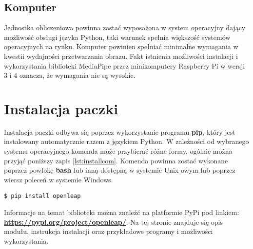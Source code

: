 \subsection{Komputer}
\quad Jednostka obliczeniowa powinna zostać wyposażona w system operacyjny dający możliwość obsługi języka Python, taki warunek spełnia większość systemów operacyjnych na rynku. Komputer powinien spełniać minimalne wymagania w kwestii wydajności przetwarzania obrazu. Fakt istnienia możliwości instalacji i wykorzystania biblioteki MediaPipe przez minikomputery Raspberry Pi w wersji 3 i 4 oznacza, że wymagania nie są wysokie. 


\section{Instalacja paczki}
\quad Instalacja paczki odbywa się poprzez wykorzystanie programu \textbf{pip}, który jest instalowany automatycznie razem z językiem Python. W zależności od wybranego systemu operacyjnego komenda może przybierać różne formy, ogólnie można przyjąć poniższy zapis \ref{lst:installcom}. Komenda powinna zostać wykonane poprzez powłokę \textbf{bash} lub inną dostępną w systemie Unix-owym lub poprzez wiersz poleceń w systemie Windows. 

\begin{lstlisting}[language=bash, style=command, label={lst:installcom}, caption={Instalacja paczki}]
    $ pip install openleap
\end{lstlisting}

\quad Informacje na temat biblioteki można znaleźć na platformie PyPi pod linkiem: \textbf{\href{https://pypi.org/project/openleap/}{https://pypi.org/project/openleap/}}. Na tej stronie znajduje się opis modułu, instrukcja instalacji oraz przykładowe programy i możliwości wykorzystania.

